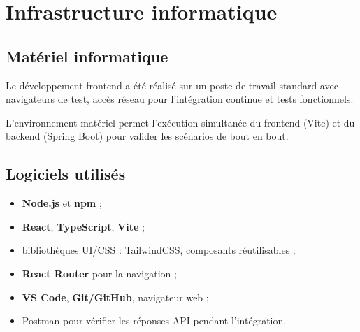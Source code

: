 \chapter{Infrastructure informatique}

\section{Matériel informatique}
Le développement frontend a été réalisé sur un poste de travail standard avec navigateurs de test, accès réseau pour l'intégration continue et tests fonctionnels.

L'environnement matériel permet l'exécution simultanée du frontend (Vite) et du backend (Spring Boot) pour valider les scénarios de bout en bout.

\section{Logiciels utilisés}
\begin{itemize}
  \item \textbf{Node.js} et \textbf{npm} ;
  \item \textbf{React}, \textbf{TypeScript}, \textbf{Vite} ;
  \item bibliothèques UI/CSS : TailwindCSS, composants réutilisables ;
  \item \textbf{React Router} pour la navigation ;
  \item \textbf{VS Code}, \textbf{Git/GitHub}, navigateur web ;
  \item Postman pour vérifier les réponses API pendant l'intégration.
\end{itemize}

